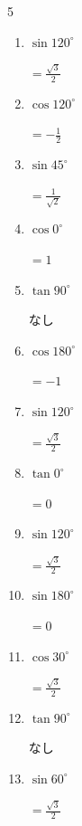 \begin{multicols}{5}
\begin{enumerate}
  \item $\displaystyle \sin{120^\circ}$

        $\displaystyle =\frac{\sqrt{3}}{2}$

  \item $\displaystyle \cos{120^\circ}$

        $\displaystyle =-\frac{1}{2}$

  \item $\displaystyle \sin{45^\circ}$

        $\displaystyle =\frac{1}{\sqrt{2}}$

  \item $\displaystyle \cos{0^\circ}$

        $\displaystyle =1$

  \item $\displaystyle \tan{90^\circ}$

        $\displaystyle なし$

  \item $\displaystyle \cos{180^\circ}$

        $\displaystyle =-1$

\columnbreak %

  \item $\displaystyle \sin{120^\circ}$

        $\displaystyle =\frac{\sqrt{3}}{2}$

  \item $\displaystyle \tan{0^\circ}$

        $\displaystyle =0$

  \item $\displaystyle \sin{120^\circ}$

        $\displaystyle =\frac{\sqrt{3}}{2}$

  \item $\displaystyle \sin{180^\circ}$

        $\displaystyle =0$

  \item $\displaystyle \cos{30^\circ}$

        $\displaystyle =\frac{\sqrt{3}}{2}$

  \item $\displaystyle \tan{90^\circ}$

        $\displaystyle なし$

  \item $\displaystyle \sin{60^\circ}$

        $\displaystyle =\frac{\sqrt{3}}{2}$


\end{enumerate}
\end{multicols}
